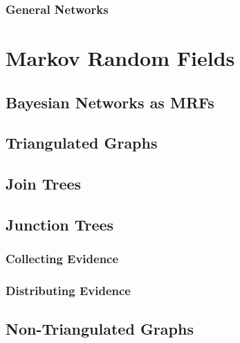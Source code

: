 		\subsection{General Networks} %

\chapter{Markov Random Fields} %

	\section{Bayesian Networks as MRFs} %

	\section{Triangulated Graphs} %

	\section{Join Trees} %

	\section{Junction Trees} %
		\label{sec:junctionTrees}


		\subsection{Collecting Evidence} %

		\subsection{Distributing Evidence} %

	\section{Non-Triangulated Graphs} %


